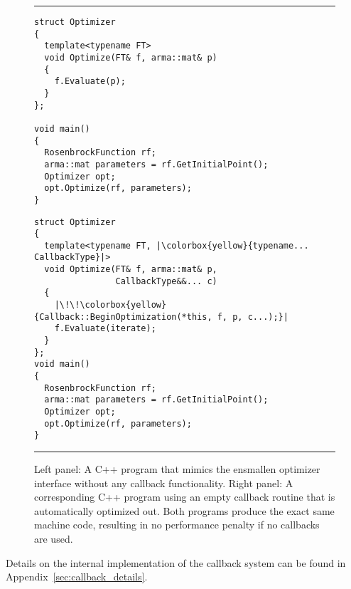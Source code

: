 \begin{figure}[b!]
\centering
\hrule
\vspace{1ex}
\begin{minipage}{0.47\textwidth}
\begin{verbatim}
struct Optimizer
{
  template<typename FT>
  void Optimize(FT& f, arma::mat& p)
  {
    f.Evaluate(p);
  }
};

void main()
{
  RosenbrockFunction rf;
  arma::mat parameters = rf.GetInitialPoint();
  Optimizer opt;
  opt.Optimize(rf, parameters);
}

\end{verbatim}
\end{minipage}
%
\hfill
\vline
\hfill
%
\begin{minipage}{0.51\textwidth}
\begin{verbatim}
struct Optimizer
{
  template<typename FT, |\colorbox{yellow}{typename... CallbackType}|>
  void Optimize(FT& f, arma::mat& p,
                CallbackType&&... c)
  {
    |\!\!\colorbox{yellow}{Callback::BeginOptimization(*this, f, p, c...);}|
    f.Evaluate(iterate);
  }
};
void main()
{
  RosenbrockFunction rf;
  arma::mat parameters = rf.GetInitialPoint();
  Optimizer opt;
  opt.Optimize(rf, parameters);
}
\end{verbatim}
\end{minipage}
\vspace{1ex}
\hrule
\caption
  {
  Left panel: A C++ program that mimics the ensmallen optimizer interface
  without any callback functionality. Right panel: A corresponding C++ program
  using an empty callback routine that is automatically optimized out. Both
  programs produce the exact same machine code, resulting in no performance
  penalty if no callbacks are used.
  }
\label{fig:callback_compilter_opt}
\end{figure}

Details on the internal implementation of the callback system can be found in
Appendix~\ref{sec:callback_details}.
